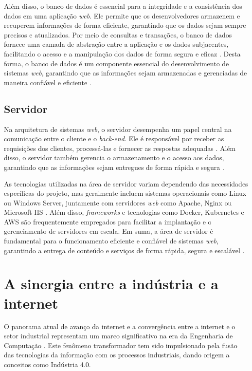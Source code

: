 Além disso, o banco de dados é essencial para a integridade e a consistência dos dados em uma aplicação \textit{web}. Ele permite que os desenvolvedores armazenem e recuperem informações de forma eficiente, garantindo que os dados sejam sempre precisos e atualizados. Por meio de consultas e transações, o banco de dados fornece uma camada de abstração entre a aplicação e os dados subjacentes, facilitando o acesso e a manipulação dos dados de forma segura e eficaz \cite{databasesql}. Desta forma, o banco de dados é um componente essencial do desenvolvimento de sistemas \textit{web}, garantindo que as informações sejam armazenadas e gerenciadas de maneira confiável e eficiente \cite{databasesqlmaster}.

\subsection{Servidor}
    
Na arquitetura de sistemas \textit{web}, o servidor desempenha um papel central na comunicação entre o cliente e o \textit{back-end}. Ele é responsável por receber as requisições dos clientes, processá-las e fornecer as respostas adequadas \cite{serverdummy}. Além disso, o servidor também gerencia o armazenamento e o acesso aos dados, garantindo que as informações sejam entregues de forma rápida e segura \cite{serverhost}.
    
As tecnologias utilizadas na área de servidor variam dependendo das necessidades específicas do projeto, mas geralmente incluem sistemas operacionais como Linux ou Windows Server, juntamente com servidores \textit{web} como Apache, Nginx ou Microsoft IIS \cite{serverapache}. Além disso, \textit{frameworks} e tecnologias como Docker, Kubernetes e AWS são frequentemente empregados para facilitar a implantação e o gerenciamento de servidores em escala. Em suma, a área de servidor é fundamental para o funcionamento eficiente e confiável de sistemas \textit{web}, garantindo a entrega de conteúdo e serviços de forma rápida, segura e escalável \cite{serversql}.
    
\section{A sinergia entre a indústria e a internet} 

O panorama atual de avanço da internet e a convergência entre a internet e o setor industrial representam um marco significativo na era da Engenharia de Computação \cite{industry4status}. Este fenômeno transformador tem sido impulsionado pela fusão das tecnologias da informação com os processos industriais, dando origem a conceitos como Indústria 4.0. 
    

